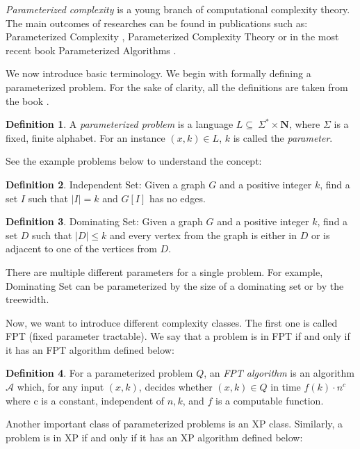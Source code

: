 \documentclass[en]{pracamgr}
\theoremstyle{definition}
\newtheorem{definition}{Definition}
\newcommand{\domsetp}{{\sc Dominating Set}}
\newcommand{\indset}{{\sc Independent Set}}
\begin{document}
\emph{Parameterized complexity} is a young branch of computational complexity theory. The main outcomes of researches can be found in publications such as: Parameterized Complexity \cite{ParComp}, Parameterized Complexity Theory \cite{ParCompThm} or in the most recent book Parameterized Algorithms \cite{ParAlg}.

We now introduce basic terminology. We begin with formally defining a parameterized problem. For the sake of clarity, all the definitions are taken from the book \cite{ParAlg}.

\begin{definition}\label{Parameterized problem}
	A \textit{parameterized problem} is a language $L \subseteq \ \Sigma^* \times \mathbf{N}$, where $\Sigma$ is a fixed, finite alphabet. For an instance $(x,k) \in L$, $k$ is called the \textit{parameter}.
\end{definition}

See the example problems below to understand the concept:

\begin{definition}
	\indset{}: Given a graph $G$ and a positive integer $k$, find a set $I$ such that $|I| = k$ and $G[I]$ has no edges.
\end{definition}

\begin{definition}
	\domsetp{}: Given a graph $G$ and a positive integer $k$, find a set $D$ such that $|D| \leq k$ and every vertex from the graph is either in $D$ or is adjacent to one of the vertices from $D$.
\end{definition}

There are multiple different parameters for a single problem. For example, \domsetp{} can be parameterized by the size of a dominating set or by the treewidth. 

Now, we want to introduce different complexity classes. The first one is called FPT (fixed parameter tractable). We say that a problem is in FPT if and only if it has an FPT algorithm defined below:

\begin{definition}\label{FPT algorithm}
	For a parameterized problem $Q$, an \textit{FPT algorithm} is an algorithm $\mathcal{A}$ which, for any input $(x,k)$, decides whether $(x,k) \in Q$ in time $f(k)\cdot n^c$ where c is a constant, independent of $n,k$, and $f$ is a computable function.
\end{definition}

Another important class of parameterized problems is an XP class. Similarly, a problem is in XP if and only if it has an XP algorithm defined below:
\end{document}
